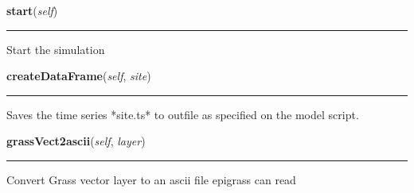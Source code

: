     \label{Epigrass:manager:simulate:start}

    \vspace{0.5ex}

    \begin{boxedminipage}{\textwidth}

    \raggedright \textbf{start}(\textit{self})

    \vspace{-1.5ex}

    \rule{\textwidth}{0.5\fboxrule}
    Start the simulation

    \vspace{1ex}

    \end{boxedminipage}

    \label{Epigrass:manager:simulate:createDataFrame}

    \vspace{0.5ex}

    \begin{boxedminipage}{\textwidth}

    \raggedright \textbf{createDataFrame}(\textit{self}, \textit{site})

    \vspace{-1.5ex}

    \rule{\textwidth}{0.5\fboxrule}
    Saves the time series *site.ts* to outfile as specified on the model 
    script.

    \vspace{1ex}

    \end{boxedminipage}

    \label{Epigrass:manager:simulate:grassVect2ascii}

    \vspace{0.5ex}

    \begin{boxedminipage}{\textwidth}

    \raggedright \textbf{grassVect2ascii}(\textit{self}, \textit{layer})

    \vspace{-1.5ex}

    \rule{\textwidth}{0.5\fboxrule}
    Convert Grass vector layer to an ascii file epigrass can read

    \vspace{1ex}

    \end{boxedminipage}

